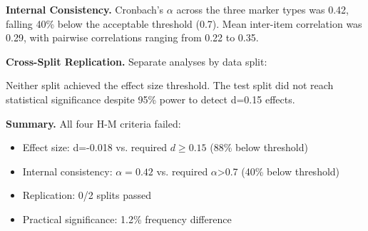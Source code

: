 \textbf{Internal Consistency.} Cronbach's $\alpha$ across the three marker types was 0.42, falling 40\% below the acceptable threshold (0.7). Mean inter-item correlation was 0.29, with pairwise correlations ranging from 0.22 to 0.35.

\textbf{Cross-Split Replication.} Separate analyses by data split:

\begin{table}[htbp]
\centering
{}
\end{table}

Neither split achieved the effect size threshold. The test split did not reach statistical significance despite 95\% power to detect d=0.15 effects.

\textbf{Summary.} All four H-M criteria failed:
\begin{itemize}
\item Effect size: d=-0.018 vs. required $d\geq 0.15$ (88\% below threshold)
\item Internal consistency: $\alpha =0.42$ vs. required $\alpha$>0.7 (40\% below threshold)
\item Replication: 0/2 splits passed
\item Practical significance: 1.2\% frequency difference
\end{itemize}
